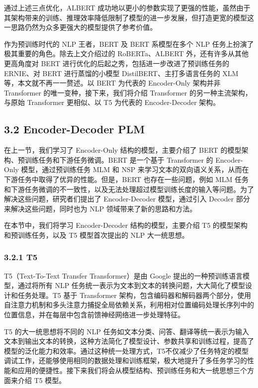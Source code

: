 \documentclass[12pt,a4paper]{book}
\begin{document}
通过上述三点优化，ALBERT
成功地以更小的参数实现了更强的性能，虽然由于其架构带来的训练、推理效率降低限制了模型的进一步发展，但打造更宽的模型这一思路仍然为众多更强大的模型提供了参考价值。

作为预训练时代的 NLP 王者，BERT 及 BERT 系模型在多个 NLP
任务上扮演了极其重要的角色。除去上文介绍过的 RoBERTa、ALBERT
外，还有许多从其他更高角度对 BERT
进行优化的后起之秀，包括进一步改进了预训练任务的 ERNIE、对 BERT
进行蒸馏的小模型 DistilBERT、主打多语言任务的 XLM
等，本文就不再一一赘述。以 BERT 为代表的 Encoder-Only 架构并非
Transformer 的唯一变种，接下来，我们将介绍 Transformer
的另一种主流架构，与原始 Transformer 更相似、以 T5 为代表的
Encoder-Decoder 架构。

\subsection{3.2 Encoder-Decoder PLM}\label{encoder-decoder-plm}

在上一节，我们学习了 Encoder-Only 结构的模型，主要介绍了 BERT
的模型架构、预训练任务和下游任务微调。BERT 是一个基于 Transformer 的
Encoder-Only 模型，通过预训练任务 MLM 和 NSP
来学习文本的双向语义关系，从而在下游任务中取得了优异的性能。但是，BERT
也存在一些问题，例如 MLM
任务和下游任务微调的不一致性，以及无法处理超过模型训练长度的输入等问题。为了解决这些问题，研究者们提出了
Encoder-Decoder 模型，通过引入 Decoder 部分来解决这些问题，同时也为 NLP
领域带来了新的思路和方法。

在本节中，我们将学习 Encoder-Decoder 结构的模型，主要介绍 T5
的模型架构和预训练任务，以及 T5 模型首次提出的 NLP 大一统思想。

\subsubsection{3.2.1 T5}\label{t5}

T5（Text-To-Text Transfer Transformer）是由 Google
提出的一种预训练语言模型，通过将所有 NLP
任务统一表示为文本到文本的转换问题，大大简化了模型设计和任务处理。T5
基于 Transformer
架构，包含编码器和解码器两个部分，使用自注意力机制和多头注意力捕捉全局依赖关系，利用相对位置编码处理长序列中的位置信息，并在每层中包含前馈神经网络进一步处理特征。

T5 的大一统思想将不同的 NLP
任务如文本分类、问答、翻译等统一表示为输入文本到输出文本的转换，这种方法简化了模型设计、参数共享和训练过程，提高了模型的泛化能力和效率。通过这种统一处理方式，T5不仅减少了任务特定的模型调试工作，还能够使用相同的数据处理和训练框架，极大地提升了多任务学习的性能和应用的便捷性。接下来我们将会从模型结构、预训练任务和大一统思想三个方面来介绍
T5 模型。
\end{document}
